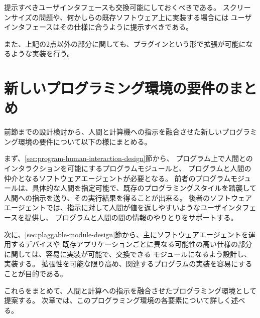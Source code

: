 提示すべきユーザインタフェースも交換可能にしておくべきである。
スクリーンサイズの問題や、何かしらの既存ソフトウェア上に実装する場合には
ユーザインタフェースはその仕様に合うように提示すべきである。

また、上記の2点以外の部分に関しても、プラグインという形で拡張が可能になるような実装を行う。

\section{新しいプログラミング環境の要件のまとめ}\label{ux65b0ux3057ux3044ux30d7ux30edux30b0ux30e9ux30dfux30f3ux30b0ux74b0ux5883ux306eux8981ux4ef6ux306eux307eux3068ux3081}

前節までの設計検討から、人間と計算機への指示を融合させた新しいプログラミング環境の要件について以下の様にまとめる。

まず、\ref{sec:program-human-interaction-design}節から、
プログラム上で人間とのインタラクションを可能にするプログラムモジュールと、
プログラムと人間の仲介となるソフトウェアエージェントが必要となる。
前者のプログラムモジュールは、具体的な人間を指定可能で、既存のプログラミングスタイルを踏襲して
人間への指示を送り、その実行結果を得ることが出来る。
後者のソフトウェアエージェントでは、指示に対して人間が値を返しやすいようなユーザインタフェースを提供し、
プログラムと人間の間の情報のやりとりをサポートする。

次に、\ref{sec:plaggable-module-design}節から、主にソフトウェアエージェントを運用するデバイスや
既存アプリケーションごとに異なる可能性の高い仕様の部分に関しては、容易に実装が可能で、交換できる
モジュールになるよう設計し、実装する。
拡張性を可能な限り高め、関連するプログラムの実装を容易にすることが目的である。

これらをまとめて、人間と計算への指示を融合させたプログラミング環境として提案する。
次章では、このプログラミング環境の各要素について詳しく述べる。

